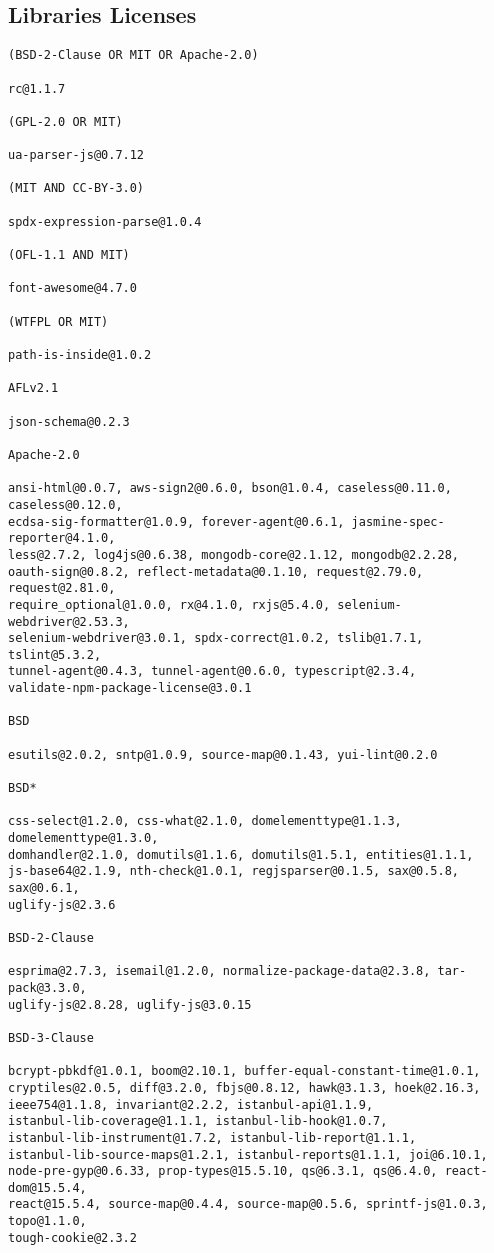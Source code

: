 \documentclass[a4paper]{article}
\begin{document}
\subsection{Libraries Licenses}
\begin{verbatim}
(BSD-2-Clause OR MIT OR Apache-2.0)

rc@1.1.7

(GPL-2.0 OR MIT)

ua-parser-js@0.7.12

(MIT AND CC-BY-3.0)

spdx-expression-parse@1.0.4

(OFL-1.1 AND MIT)

font-awesome@4.7.0

(WTFPL OR MIT)

path-is-inside@1.0.2

AFLv2.1

json-schema@0.2.3

Apache-2.0

ansi-html@0.0.7, aws-sign2@0.6.0, bson@1.0.4, caseless@0.11.0, caseless@0.12.0,
ecdsa-sig-formatter@1.0.9, forever-agent@0.6.1, jasmine-spec-reporter@4.1.0,
less@2.7.2, log4js@0.6.38, mongodb-core@2.1.12, mongodb@2.2.28,
oauth-sign@0.8.2, reflect-metadata@0.1.10, request@2.79.0, request@2.81.0,
require_optional@1.0.0, rx@4.1.0, rxjs@5.4.0, selenium-webdriver@2.53.3,
selenium-webdriver@3.0.1, spdx-correct@1.0.2, tslib@1.7.1, tslint@5.3.2,
tunnel-agent@0.4.3, tunnel-agent@0.6.0, typescript@2.3.4,
validate-npm-package-license@3.0.1

BSD

esutils@2.0.2, sntp@1.0.9, source-map@0.1.43, yui-lint@0.2.0

BSD*

css-select@1.2.0, css-what@2.1.0, domelementtype@1.1.3, domelementtype@1.3.0,
domhandler@2.1.0, domutils@1.1.6, domutils@1.5.1, entities@1.1.1,
js-base64@2.1.9, nth-check@1.0.1, regjsparser@0.1.5, sax@0.5.8, sax@0.6.1,
uglify-js@2.3.6

BSD-2-Clause

esprima@2.7.3, isemail@1.2.0, normalize-package-data@2.3.8, tar-pack@3.3.0,
uglify-js@2.8.28, uglify-js@3.0.15

BSD-3-Clause

bcrypt-pbkdf@1.0.1, boom@2.10.1, buffer-equal-constant-time@1.0.1,
cryptiles@2.0.5, diff@3.2.0, fbjs@0.8.12, hawk@3.1.3, hoek@2.16.3,
ieee754@1.1.8, invariant@2.2.2, istanbul-api@1.1.9,
istanbul-lib-coverage@1.1.1, istanbul-lib-hook@1.0.7,
istanbul-lib-instrument@1.7.2, istanbul-lib-report@1.1.1,
istanbul-lib-source-maps@1.2.1, istanbul-reports@1.1.1, joi@6.10.1,
node-pre-gyp@0.6.33, prop-types@15.5.10, qs@6.3.1, qs@6.4.0, react-dom@15.5.4,
react@15.5.4, source-map@0.4.4, source-map@0.5.6, sprintf-js@1.0.3, topo@1.1.0,
tough-cookie@2.3.2


\end{verbatim}
\end{document}
